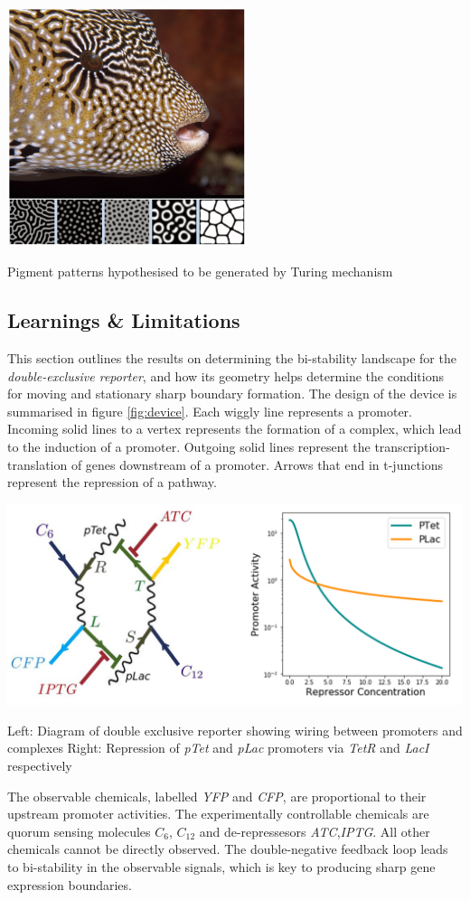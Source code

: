 \begin{Figure}
\includegraphics[width=70mm]{figures/turing.png}
\caption{Pigment patterns hypothesised to be generated by Turing mechanism}
\label{fig:turing}
\end{Figure}

\subsection{Learnings \& Limitations}
This section outlines the results on determining the bi-stability landscape for the
\textit{double-exclusive reporter}, and how its geometry helps determine the conditions for
moving and stationary sharp boundary formation. The design of the device is summarised 
in figure \ref{fig:device}. Each wiggly line represents a promoter. Incoming solid lines
to a vertex represents the formation of a complex, which lead to the induction of a promoter.
Outgoing solid lines represent the transcription-translation of genes downstream of a
promoter. Arrows that end in t-junctions represent the repression of a pathway.

\begin{Figure}
\includegraphics[width=140mm]{figures/device.png}
\caption{Left: Diagram of double exclusive reporter showing wiring between promoters
and complexes Right: Repression of \textit{pTet} and \textit{pLac} promoters via
\textit{TetR} and \textit{LacI} respectively}
\label{fig:device}
\end{Figure}
\noindent
The observable chemicals, labelled \textit{YFP} and \textit{CFP}, are
proportional to their upstream promoter activities. The experimentally controllable chemicals
are quorum sensing molecules $C_6$, $C_{12}$ and de-repressesors \textit{ATC},\textit{IPTG}.
All other chemicals cannot be directly observed. The double-negative feedback loop leads
to bi-stability in the observable signals, which is key to producing sharp gene
expression boundaries.

